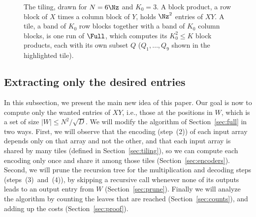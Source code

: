 \begin{figure}[tb]
\centering
{}
\caption{The tiling, drawn for $N=6\Nz$ and $K_0=3$. A block product, a row block of $X$ times a column block of $Y$, holds $\Nz^2$ entries of $XY$. A tile, a band of $K_0$ row blocks together with a band of $K_0$ column blocks, is one run of $\Full$, which computes its $K_0^2\le K$ block products, each with its own subset $Q$ ($Q_1,\dots,Q_9$ shown in the highlighted tile).}\label{fig:tiling}
\end{figure}

\subsection{Extracting only the desired entries}\label{sec:sparse}

In this subsection, we present the main new idea of this paper. Our goal is now to compute only the wanted entries of $XY$, i.e., those at the positions in $W$, which is a set of size $|W| \leq N^2/\sqrt D$. We will modify the algorithm of Section~\ref{sec:full} in two ways. First, we will observe that the encoding (step~(2)) of each input array depends only on that array and not the other, and that each input array is shared by many tiles (defined in Section~\ref{sec:tiling}), so we can compute each encoding only once and share it among those tiles (Section~\ref{sec:encoders}). Second, we will prune the recursion tree for the multiplication and decoding steps (steps~(3)~and~(4)), by skipping a recursive call whenever none of its outputs leads to an output entry from $W$ (Section~\ref{sec:prune}). Finally we will analyze the algorithm by counting the leaves that are reached (Section~\ref{sec:counts}), and adding up the costs (Section~\ref{sec:proof}).

